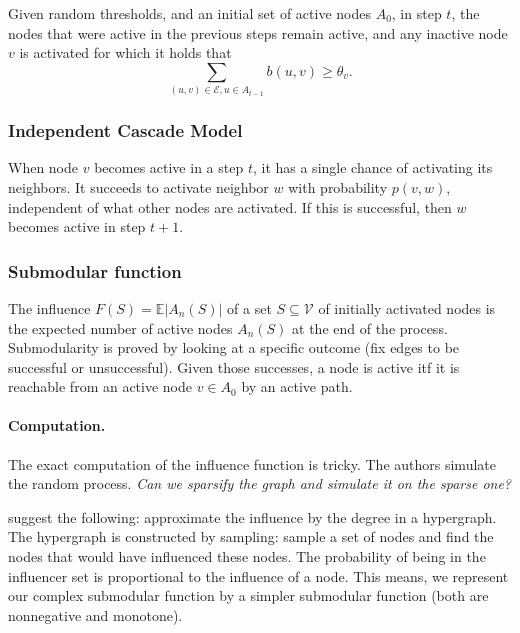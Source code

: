 \documentclass{article}
\newcommand{\Es}{\mathcal{E}}
\newcommand{\Vs}{\mathcal{V}}
\begin{document}
Given random thresholds, and an initial set of active nodes $A_0$, in step $t$, the nodes that were active in the previous steps remain active, and any inactive node $v$ is activated for which it holds that
\begin{equation*}
  \sum_{(u,v) \in \Es, u \in A_{t-1}} b(u,v) \geq \theta_v.
\end{equation*}

\subsubsection{Independent Cascade Model}
When node $v$ becomes active in a step $t$, it has a single chance of activating its neighbors. It succeeds to activate neighbor $w$ with probability $p(v,w)$, independent of what other nodes are activated. If this is successful, then $w$ becomes active in step $t+1$. 

\subsubsection{Submodular function}
The influence $F(S) = \mathbb{E}|A_n(S)|$ of a set $S \subseteq \Vs$ of initially activated nodes is the expected number of active nodes $A_n(S)$ at the end of the process. Submodularity is proved by looking at a specific outcome (fix edges to be successful or unsuccessful). Given those successes, a node is active itf it is reachable from an active node $v \in A_0$ by an active path.

\paragraph{Computation.} The exact computation of the influence function is tricky. The authors simulate the random process.
\emph{Can we sparsify the graph and simulate it on the sparse one?}

\citet{borgs13} suggest the following: approximate the influence by the degree in a hypergraph. The hypergraph is constructed by sampling: sample a set of nodes and find the nodes that would have influenced these nodes. The probability of being in the influencer set is proportional to the influence of a node. This means, we represent our complex submodular function by a simpler submodular function (both are nonnegative and monotone).




\end{document}
